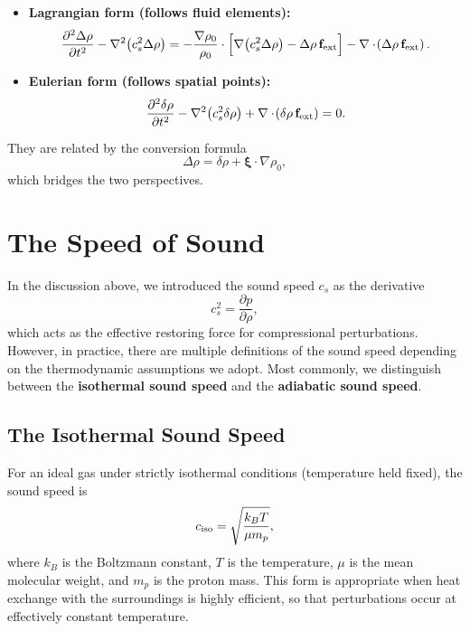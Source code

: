 \begin{bigidea}
\begin{itemize}
    \item \textbf{Lagrangian form (follows fluid elements):}
    \[
    \frac{\partial^2 \Delta \rho}{\partial t^2} 
    - \nabla^2 \!\left(c_s^2 \Delta \rho\right)
    = - \frac{\nabla \rho_0}{\rho_0} \cdot 
    \Big[\nabla \!\left(c_s^2 \Delta \rho\right) - \Delta \rho\, {\bf f}_{\rm ext}\Big]
    - \nabla \cdot \!\left(\Delta \rho\, {\bf f}_{\rm ext}\right).
    \]

    \item \textbf{Eulerian form (follows spatial points):}
    \[
    \frac{\partial^2 \delta \rho}{\partial t^2}
    - \nabla^2 \!\left(c_s^2 \delta \rho\right)
    + \nabla \cdot \!\left( \delta \rho\, \mathbf{f}_{\rm ext} \right) = 0.
    \]
\end{itemize}

They are related by the conversion formula
\[
\Delta \rho = \delta \rho + \boldsymbol{\xi}\cdot\nabla \rho_0,
\]
which bridges the two perspectives.
\end{bigidea}

\section{The Speed of Sound}

In the discussion above, we introduced the sound speed $c_s$ as the derivative
\[
c_s^2 = \frac{\partial p}{\partial \rho},
\]
which acts as the effective restoring force for compressional perturbations.  
However, in practice, there are multiple definitions of the sound speed depending
on the thermodynamic assumptions we adopt.  Most commonly, we distinguish between
the \textbf{isothermal sound speed} and the \textbf{adiabatic sound speed}.

\subsection*{The Isothermal Sound Speed}

For an ideal gas under strictly isothermal conditions (temperature held fixed), 
the sound speed is
\begin{equation}
    c_{\rm iso} = \sqrt{\frac{k_B T}{\mu m_p}},
\end{equation}
where $k_B$ is the Boltzmann constant, $T$ is the temperature, $\mu$ is the mean
molecular weight, and $m_p$ is the proton mass.  
This form is appropriate when heat exchange with the surroundings is highly efficient,
so that perturbations occur at effectively constant temperature.

